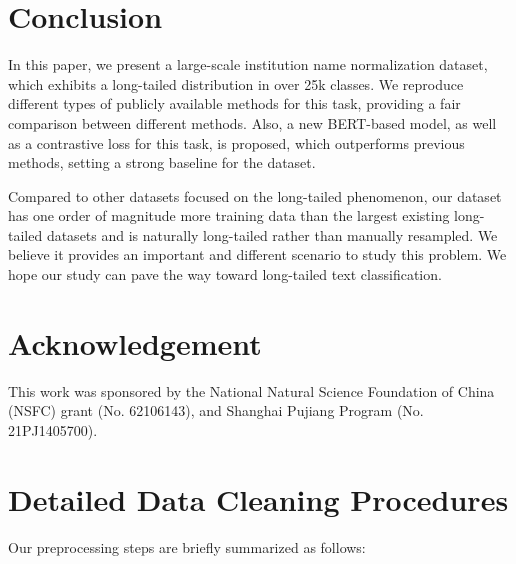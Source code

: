 \documentclass{article}
\begin{document}
\section{Conclusion}
\label{ssec:layout}

In this paper, we present a large-scale institution name normalization dataset, which exhibits a long-tailed distribution in over 25k classes. We reproduce different types of publicly available methods for this task, providing a fair comparison between different methods. Also, a new BERT-based model, as well as a contrastive loss for this task, is proposed, which outperforms previous methods, setting a strong baseline for the dataset.

Compared to other datasets focused on the long-tailed phenomenon, our dataset has one order of magnitude more training data than the largest existing long-tailed datasets and is naturally long-tailed rather than manually resampled. We believe it provides an important and different scenario to study this problem. We hope our study can pave the way toward long-tailed text classification.

\section*{Acknowledgement}
This work was sponsored by the National Natural Science Foundation of China (NSFC) grant (No.
62106143), and Shanghai Pujiang Program (No. 21PJ1405700).

\clearpage

\vfill\pagebreak








\clearpage
\appendix

\section{Detailed Data Cleaning Procedures} \label{appendixA}






Our preprocessing steps are briefly summarized as follows:
\end{document}
